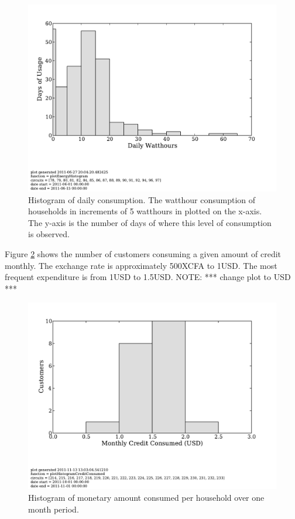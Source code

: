 \documentclass[conference]{IEEEtran}
\newcommand{\note}[1]{{\color{red} NOTE: *** #1 ***}}
\begin{document}
\begin{figure}[]
\begin{center}
\includegraphics[trim = 0in 1.3in 0in 0in, clip, width=\columnwidth]
                {figures/ml06Histogram.pdf}
\end{center}
\caption{Histogram of daily consumption.  The watthour consumption of households
in increments of 5 watthours in plotted on the x-axis.  The y-axis is the number of
days of where this level of consumption is observed.}
\label{ml06Histogram}
\end{figure}

Figure \ref{consumptionHistogram} shows the number of customers consuming
a given amount of credit monthly.  The exchange rate is approximately 500XCFA to 1USD.
The most frequent expenditure is from 1USD to 1.5USD.
\note{change plot to USD}

\begin{figure}[]
\begin{center}
\includegraphics[trim = 0in 1.3in 0in 0in, clip, width=\columnwidth]
                {figures/consumptionHistogram.pdf}
\end{center}
\caption{Histogram of monetary amount consumed per household over one month period.}
\label{consumptionHistogram}
\end{figure}
\end{document}
